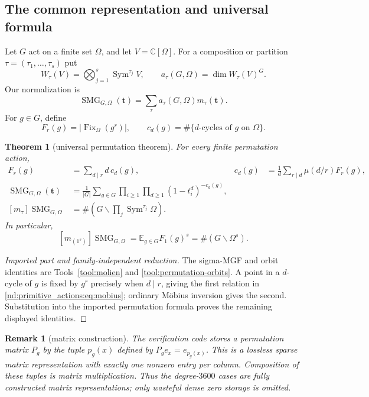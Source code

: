 \documentclass[10pt]{article}
\newcommand{\Sym}{\operatorname{Sym}}
\newcommand{\Fix}{\operatorname{Fix}}
\newcommand{\SMG}{\operatorname{SMG}}
\newcommand{\MGF}{\SMG}
\newcommand{\C}{\mathbb C}
\newcommand{\E}{\mathbb E}
\newtheorem{theorem}{Theorem}
\newtheorem{remark}{Remark}
\begin{document}
\subsection{The common representation and universal formula}

Let $G$ act on a finite set $\Omega$, and let $V=\C[\Omega]$.  For a
composition or partition $\tau=(\tau_1,\ldots,\tau_s)$ put
\[
 W_\tau(V)=\bigotimes_{j=1}^s\Sym^{\tau_j}V,
 \qquad
 a_\tau(G,\Omega)=\dim W_\tau(V)^G.
\]
Our normalization is
\[
 \MGF_{G,\Omega}(\mathbf t)=\sum_\tau a_\tau(G,\Omega)m_\tau(\mathbf t).
\]
For $g\in G$, define
\[
 F_r(g)=|\Fix_\Omega(g^r)|,
 \qquad
 c_d(g)=\#\{\text{$d$-cycles of $g$ on $\Omega$}\}.
\]

\begin{theorem}[universal permutation theorem]\label{nd:primitive_actions:thm:universal}
For every finite permutation action,
\begin{align}
 F_r(g)&=\sum_{d\mid r}d\,c_d(g),
 &
 c_d(g)&=\frac1d\sum_{r\mid d}\mu(d/r)F_r(g),\label{nd:primitive_actions:eq:mobius}\\
 \MGF_{G,\Omega}(\mathbf t)
 &=\frac1{|G|}\sum_{g\in G}\prod_{i\ge1}\prod_{d\ge1}
 (1-t_i^d)^{-c_d(g)},\label{nd:primitive_actions:eq:universal-smg}\\
 [m_\tau]\MGF_{G,\Omega}
 &=\#\left(G\backslash\prod_j\Sym^{\tau_j}\Omega\right).
 \label{nd:primitive_actions:eq:orbit-interpretation}
\end{align}
In particular,
\begin{equation}\label{nd:primitive_actions:eq:fixed-moment}
 [m_{(1^s)}]\MGF_{G,\Omega}
 =\E_{g\in G}F_1(g)^s
 =\#(G\backslash\Omega^s).
\end{equation}
\end{theorem}

\begin{proof}[Imported part and family-independent reduction]
The sigma-MGF and orbit identities are Tools~\ref{tool:molien} and
\ref{tool:permutation-orbits}.  A point in a $d$-cycle of $g$ is fixed by
$g^r$ precisely when $d\mid r$, giving the first relation in
\eqref{nd:primitive_actions:eq:mobius}; ordinary M\"obius inversion gives the
second.  Substitution into the imported permutation formula proves the
remaining displayed identities.
\end{proof}

\begin{remark}[matrix construction]
The verification code stores a permutation matrix $P_g$ by the tuple
$p_g(x)$ defined by $P_ge_x=e_{p_g(x)}$.  This is a lossless sparse matrix
representation with exactly one nonzero entry per column.  Composition of
these tuples is matrix multiplication.  Thus the degree-$3600$ cases are
fully constructed matrix representations; only wasteful dense zero storage
is omitted.
\end{remark}
\end{document}
